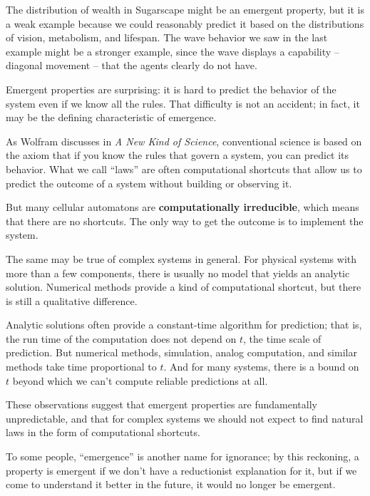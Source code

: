 \documentclass[12pt]{book}
\theoremstyle{exercise}
\begin{document}
The distribution of wealth in Sugarscape might be an emergent
property, but it is a weak example because we could
reasonably predict it based on the distributions of vision, metabolism,
and lifespan.  The wave behavior we saw in the last example might
be a stronger example, since the wave displays a capability -- diagonal
movement -- that the agents clearly do not have.

Emergent properties are surprising: it is hard to predict the behavior
of the system even if we know all the rules.  That difficulty is not
an accident; in fact, it may be the defining characteristic of emergence.

As Wolfram discusses in {\em A New Kind of Science}, conventional science
is based on the axiom that if you know the rules that govern a system,
you can predict its behavior.  What we call ``laws'' are often
computational shortcuts that allow us to predict the outcome of a
system without building or observing it.


But many cellular automatons are {\bf computationally irreducible},
which means that there are no shortcuts.  The only way to get the
outcome is to implement the system.


The same may be true of complex systems in general.  For physical
systems with more than a few components, there is usually no model
that yields an analytic solution.  Numerical methods provide a kind of
computational shortcut, but there is still a qualitative difference.

Analytic solutions often provide a constant-time algorithm for
prediction; that is, the run time of the computation does not depend
on $t$, the time scale of prediction.  But numerical methods,
simulation, analog computation, and similar methods take time
proportional to $t$.  And for many systems, there is a bound on $t$
beyond which we can't compute reliable predictions at all.

These observations suggest that emergent properties are fundamentally
unpredictable, and that for complex systems we should not expect to
find natural laws in the form of computational shortcuts.

To some people, ``emergence'' is another name for ignorance; by this
reckoning, a property is emergent if we don't have a reductionist
explanation for it, but if we come to understand it better in the
future, it would no longer be emergent.
\end{document}
